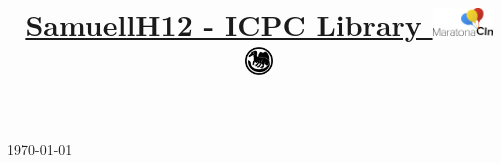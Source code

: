 \documentclass[10pt,a4paper]{article}
\title{\vspace{-5ex}\Large{\underline{
  SamuellH12 - ICPC Library
  \includegraphics[height=0.75cm]{maratona_cin.png} 
  \includegraphics[height=0.75cm]{spinosaurus.png} 
}}}
\author{}
\date{}
\begin{document}
\begin{landscape}
\begin{multicols*}{3}  %
\raggedcolumns 
{}

\maketitle
\vspace{-13ex}
{\tiny\today} \vspace{-3ex}
\tableofcontents
\pagestyle{fancy}



\end{multicols*}
\end{landscape}
\end{document}
